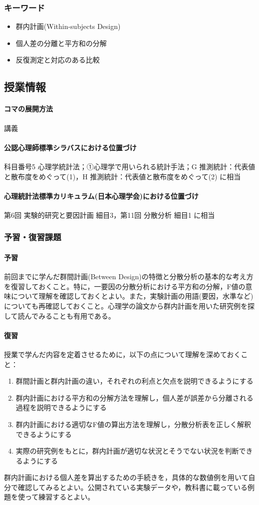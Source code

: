 \subsubsection{キーワード}
\begin{itemize}
	\item 群内計画(Within-subjects Design)
	\item 個人差の分離と平方和の分解
	\item 反復測定と対応のある比較
\end{itemize}
\subsection{授業情報}
\paragraph{コマの展開方法}
講義
\paragraph{公認心理師標準シラバスにおける位置づけ}
科目番号5 心理学統計法；①心理学で用いられる統計手法；G 推測統計：代表値と散布度をめぐって(1)，H 推測統計：代表値と散布度をめぐって(2) に相当
\paragraph{心理統計法標準カリキュラム(日本心理学会)における位置づけ}
第6回 実験的研究と要因計画 細目3，第11回 分散分析 細目1 に相当
\subsubsection{予習・復習課題}
\paragraph{予習}
前回までに学んだ群間計画(Between Design)の特徴と分散分析の基本的な考え方を復習しておくこと。特に，一要因の分散分析における平方和の分解，F値の意味について理解を確認しておくとよい。また，実験計画の用語(要因，水準など)についても再確認しておくこと。心理学の論文から群内計画を用いた研究例を探して読んでみることも有用である。

\paragraph{復習}
授業で学んだ内容を定着させるために，以下の点について理解を深めておくこと：

\begin{enumerate}
\item 群間計画と群内計画の違い，それぞれの利点と欠点を説明できるようにする
\item 群内計画における平方和の分解方法を理解し，個人差が誤差から分離される過程を説明できるようにする
\item 群内計画における適切なF値の算出方法を理解し，分散分析表を正しく解釈できるようにする
\item 実際の研究例をもとに，群内計画が適切な状況とそうでない状況を判断できるようにする
\end{enumerate}

群内計画における個人差を算出するための手続きを，具体的な数値例を用いて自分で確認してみるとよい。公開されている実験データや，教科書に載っている例題を使って練習するとよい。